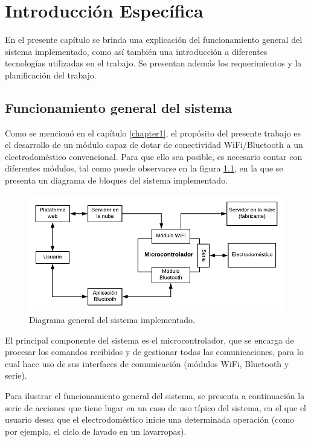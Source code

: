 \chapter{Introducción Específica}
\label{Chapter2}

En el presente capítulo se brinda una explicación del funcionamiento general del sistema implementado, como así también una introducción a diferentes tecnologías utilizadas en el trabajo. Se presentan además los requerimientos y la planificación del trabajo.

\section{Funcionamiento general del sistema}

Como se mencionó en el capítulo \ref{chapter1}, el propósito del presente trabajo es el desarrollo de un módulo capaz de dotar de conectividad WiFi/Bluetooth a un electrodoméstico convencional. Para que ello sea posible, es necesario contar con diferentes módulos, tal como puede observarse en la figura \ref{fig:simplified_diagram}, en la que se presenta un diagrama de bloques del sistema implementado. 

\begin{figure}[h]
\centering
\includegraphics[width=\textwidth]{./Figures/simplified_diagram.pdf}
\caption{Diagrama general del sistema implementado.}
\label{fig:simplified_diagram}
\end{figure}

El principal componente del sistema es el microcontrolador, que se encarga de procesar los comandos recibidos y de gestionar todas las comunicaciones, para lo cual hace uso de sus interfaces de comunicación (módulos WiFi, Bluetooth y serie).

Para ilustrar el funcionamiento general del sistema, se presenta a continuación la serie de acciones que tiene lugar en un caso de uso típico del sistema, en el que el usuario desea que el electrodoméstico inicie una determinada operación (como por ejemplo, el ciclo de lavado en un lavarropas).

